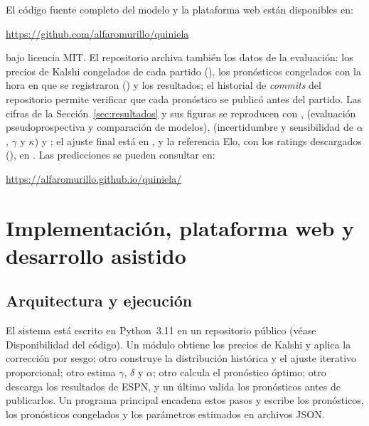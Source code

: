 \documentclass[12pt]{article}
\theoremstyle{plain}
\theoremstyle{remark}
\begin{document}
El código fuente completo del modelo y la plataforma web están
disponibles en:
\begin{center}
  \url{https://github.com/alfaromurillo/quiniela}
\end{center}
bajo licencia MIT.
El repositorio archiva también los datos de la evaluación: los precios
de Kalshi congelados de cada partido (),
los pronósticos congelados con la hora en que se registraron
() y los resultados; el
historial de \textit{commits} del repositorio permite verificar que
cada pronóstico se publicó antes del partido.
Las cifras de la Sección~\ref{sec:resultados} y sus figuras se
reproducen con ,
 (evaluación pseudoprospectiva y
comparación de modelos),  (incertidumbre y
sensibilidad de $\alpha$, $\gamma$ y $\kappa$) y
; el ajuste final está en
, y la referencia Elo, con los ratings
descargados (), en .
Las predicciones se pueden consultar en:
\begin{center}
  \url{https://alfaromurillo.github.io/quiniela/}
\end{center}

\appendix

\section{Implementación, plataforma web y desarrollo asistido}
\label{app:implementacion}

\subsection{Arquitectura y ejecución}

El sistema está escrito en Python~3.11 en un repositorio público
(véase Disponibilidad del código).
Un módulo obtiene los precios de Kalshi y aplica la corrección por
sesgo; otro construye la distribución histórica y el ajuste
iterativo proporcional; otro estima $\gamma$, $\delta$ y $\alpha$;
otro calcula el pronóstico óptimo; otro descarga los resultados de
ESPN, y un último valida los pronósticos antes de publicarlos.
Un programa principal encadena estos pasos y escribe los pronósticos,
los pronósticos congelados y los parámetros estimados en archivos
JSON.
\end{document}
